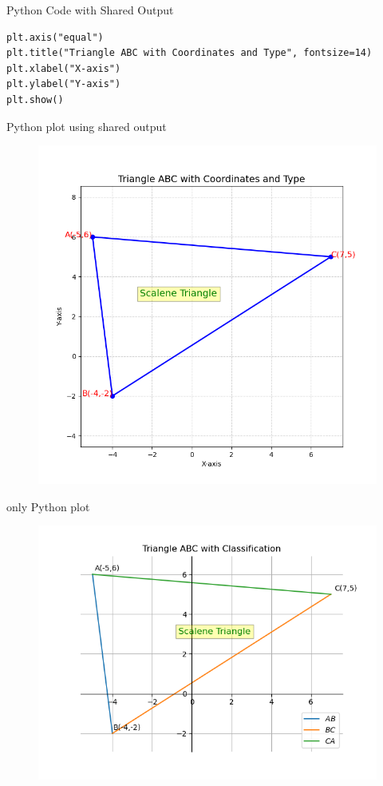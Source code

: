 \documentclass{beamer}
\begin{document}
\begin{frame}[fragile]{Python Code with Shared Output}
\begin{lstlisting}
plt.axis("equal")
plt.title("Triangle ABC with Coordinates and Type", fontsize=14)
plt.xlabel("X-axis")
plt.ylabel("Y-axis")
plt.show()
\end{lstlisting}
\end{frame}
\begin{frame}{Python plot using shared output}
   \begin{figure}
       \centering
       \includegraphics[width=0.7\linewidth]{figs/fig31.png}
       \caption{}
       \label{fig:placeholder}
   \end{figure}

\end{frame}
\begin{frame}{only Python plot}
    

\begin{figure}
    \centering
    \includegraphics[width=0.9\columnwidth]{figs/Figure32.png}
    \caption{}
    \label{fig:placeholder}
\end{figure}
\end{frame}
\end{document}
